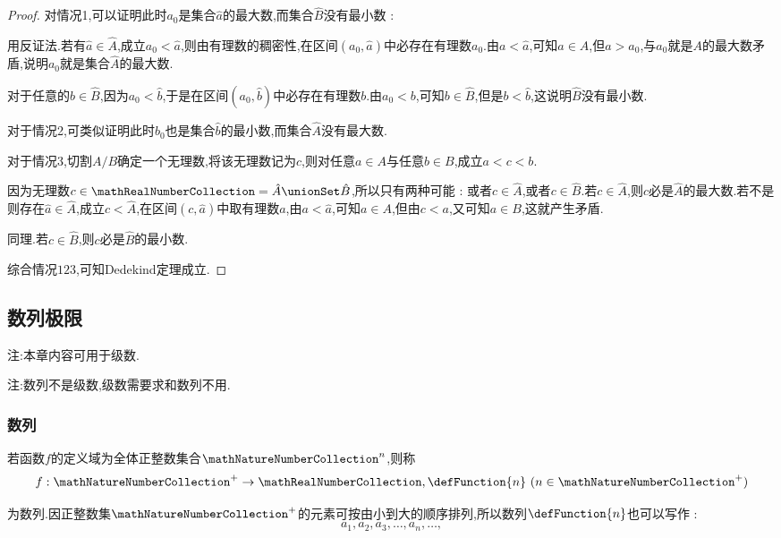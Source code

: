 {{{{{\begin{proof}
            对情况1,可以证明此时$a_0$是集合$\hat{a}$的最大数,而集合$\hat{B}$没有最小数 :

            用反证法.若有$\hat{a} \in \hat{A}$,成立$a_0 < \hat{a}$,则由有理数的稠密性,在区间$(a_0,\hat{a})$中必存在有理数$a_0$.由$a < \hat{a}$,可知$a \in A$,但$a > a_0$,与$a_0$就是$A$的最大数矛盾,说明$a_0$就是集合$\hat{A}$的最大数.

            对于任意的$\hat{b} \in \hat{B}$,因为$a_0 < \hat{b}$,于是在区间$(a_0,\hat{b})$中必存在有理数$b$.由$a_0 < b$,可知$b \in \hat{B}$,但是$b < \hat{b}$,这说明$\hat{B}$没有最小数.

            对于情况2,可类似证明此时$b_0$也是集合$\hat{b}$的最小数,而集合$\hat{A}$没有最大数.

            对于情况3,切割$A/B$确定一个无理数,将该无理数记为$c$,则对任意$a \in A$与任意$b \in B$,成立$a < c < b$.

            因为无理数$c \in \mathRealNumberCollection = \hat{A} \unionSet \hat{B}$,所以只有两种可能 : 或者$c \in \hat{A}$,或者$c \in \hat{B}$.若$c \in \hat{A}$,则$c$必是$\hat{A}$的最大数.若不是则存在$\hat{a} \in \hat{A}$,成立$c < \hat{A}$,在区间$(c,\hat{a})$中取有理数$a$,由$a < \hat{a}$,可知$a \in A$,但由$c < a$,又可知$a \in B$,这就产生矛盾.

            同理.若$c \in \hat{B}$,则$c$必是$\hat{B}$的最小数.

            综合情况$123$,可知Dedekind定理成立.

        \end{proof}
    }%

}%

}%

\subsection{数列极限}{

    注:本章内容可用于级数.

    注:数列不是级数,级数需要求和数列不用.

    \subsubsection{数列}{
        若函数$f$的定义域为全体正整数集合$\mathNatureNumberCollection^n$,则称
        $$
            f : \mathNatureNumberCollection^+ \to \mathRealNumberCollection,\defFunction{n} \ (n \in \mathNatureNumberCollection^+)
        $$

        为数列.因正整数集$\mathNatureNumberCollection^+$的元素可按由小到大的顺序排列,所以数列$\defFunction{n}$也可以写作 :
        $$
            a_1,a_2,a_3,\dots,a_n,\dots,
        $$

}}}}
